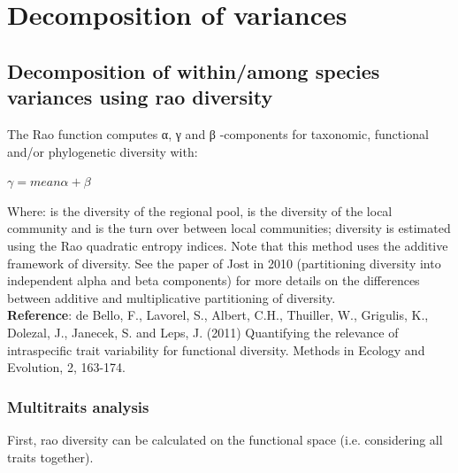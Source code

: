 \documentclass[12pt]{article}\usepackage[]{graphicx}\usepackage[]{color}
\begin{document}
\section{Decomposition of variances}

\subsection{Decomposition of within/among species variances using rao diversity}

The Rao function computes α, γ and β -components for taxonomic, functional and/or phylogenetic diversity with:

\begin{center}
$\gamma = mean \alpha + \beta$
\end{center}

Where: \gamma is the diversity of the regional pool, \alpha is the diversity of the local community and \beta is the turn over between local communities; diversity is estimated using the Rao quadratic entropy indices. Note that this method uses the additive framework of diversity. See the paper of Jost in 2010 (partitioning diversity into independent alpha and beta components) for more details on the differences between additive and multiplicative partitioning of diversity.
\\

\textbf{Reference}: de Bello, F., Lavorel, S., Albert, C.H., Thuiller, W., Grigulis, K., Dolezal, J., Janecek, S. and Leps, J. (2011) Quantifying the relevance of intraspecific trait variability for functional diversity. Methods in Ecology and Evolution, 2, 163-174.


\subsubsection{Multitraits analysis}
First, rao diversity can be calculated on the functional  space (i.e. considering all traits together).
\end{document}
